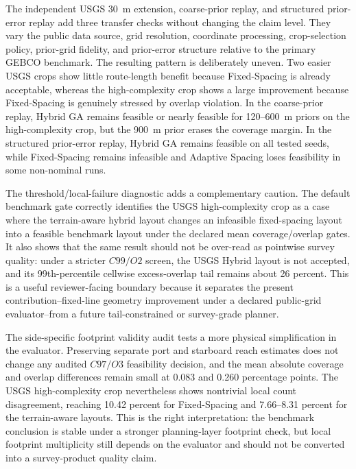 \documentclass[jmse,article,submit,moreauthors]{Definitions/mdpi}
\begin{document}
The independent USGS 30~m extension, coarse-prior replay, and structured prior-error replay add three transfer checks without changing the claim level. They vary the public data source, grid resolution, coordinate processing, crop-selection policy, prior-grid fidelity, and prior-error structure relative to the primary GEBCO benchmark. The resulting pattern is deliberately uneven. Two easier USGS crops show little route-length benefit because Fixed-Spacing is already acceptable, whereas the high-complexity crop shows a large improvement because Fixed-Spacing is genuinely stressed by overlap violation. In the coarse-prior replay, Hybrid GA remains feasible or nearly feasible for 120--600~m priors on the high-complexity crop, but the 900~m prior erases the coverage margin. In the structured prior-error replay, Hybrid GA remains feasible on all tested seeds, while Fixed-Spacing remains infeasible and Adaptive Spacing loses feasibility in some non-nominal runs.

The threshold/local-failure diagnostic adds a complementary caution. The default benchmark gate correctly identifies the USGS high-complexity crop as a case where the terrain-aware hybrid layout changes an infeasible fixed-spacing layout into a feasible benchmark layout under the declared mean coverage/overlap gates. It also shows that the same result should not be over-read as pointwise survey quality: under a stricter \(C99/O2\) screen, the USGS Hybrid layout is not accepted, and its 99th-percentile cellwise excess-overlap tail remains about 26 percent. This is a useful reviewer-facing boundary because it separates the present contribution--fixed-line geometry improvement under a declared public-grid evaluator--from a future tail-constrained or survey-grade planner.

The side-specific footprint validity audit tests a more physical simplification in the evaluator. Preserving separate port and starboard reach estimates does not change any audited \(C97/O3\) feasibility decision, and the mean absolute coverage and overlap differences remain small at 0.083 and 0.260 percentage points. The USGS high-complexity crop nevertheless shows nontrivial local count disagreement, reaching 10.42 percent for Fixed-Spacing and 7.66--8.31 percent for the terrain-aware layouts. This is the right interpretation: the benchmark conclusion is stable under a stronger planning-layer footprint check, but local footprint multiplicity still depends on the evaluator and should not be converted into a survey-product quality claim.
\end{document}
